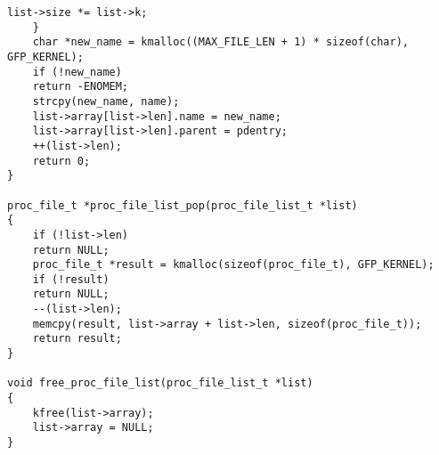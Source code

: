 \begin{center}
\begin{lstlisting}[label=listing_list_c2,caption=Файл list.c]
		list->size *= list->k;
	}
	char *new_name = kmalloc((MAX_FILE_LEN + 1) * sizeof(char), GFP_KERNEL);
	if (!new_name)
	return -ENOMEM;
	strcpy(new_name, name);
	list->array[list->len].name = new_name;
	list->array[list->len].parent = pdentry;
	++(list->len);
	return 0;
}

proc_file_t *proc_file_list_pop(proc_file_list_t *list)
{
	if (!list->len)
	return NULL;
	proc_file_t *result = kmalloc(sizeof(proc_file_t), GFP_KERNEL);
	if (!result)
	return NULL;
	--(list->len);
	memcpy(result, list->array + list->len, sizeof(proc_file_t));
	return result;
}

void free_proc_file_list(proc_file_list_t *list)
{
	kfree(list->array);
	list->array = NULL;
}
	\end{lstlisting}
\end{center}
